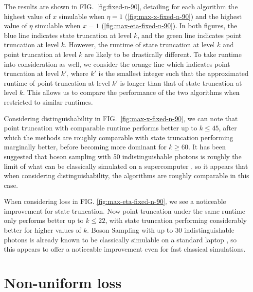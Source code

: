 The results are shown in FIG.\ \ref{fig:fixed-n-90}, detailing for each algorithm the highest value of $x$ simulable when $\eta=1$ (\ref{fig:max-x-fixed-n-90}) and the highest value of $\eta$ simulable when $x=1$ (\ref{fig:max-eta-fixed-n-90}). 
In both figures, the blue line indicates state truncation at level $k$, and the green line indicates point truncation at level $k$. 
However, the runtime of state truncation at level $k$ and point truncation at level $k$ are likely to be drastically different. 
To take runtime into consideration as well, we consider the orange line which indicates point truncation at level $k'$, where $k'$ is the smallest integer such that the approximated runtime of point truncation at level $k'$ is longer than that of state truncation at level $k$. 
This allows us to compare the performance of the two algorithms when restricted to similar runtimes.

Considering distinguishability in FIG.\ \ref{fig:max-x-fixed-n-90}, we can note that point truncation with comparable runtime performs better up to $k\leq 45$, after which the methods are roughly comparable with state truncation performing marginally better, before becoming more dominant for $k\geq 60$. 
It has been suggested that boson sampling with 50 indistinguishable photons is roughly the limit of what can be classically simulated on a supercomputer \cite{neville2017, clifford2017, zhang2018}, so it appears that when considering distinguishability, the algorithms are roughly comparable in this case.

When considering loss in FIG. \ref{fig:max-eta-fixed-n-90}, we see a noticeable improvement for state truncation. 
Now point truncation under the same runtime only performs better up to $k\leq 22$, with state truncation performing considerably better for higher values of $k$. 
Boson Sampling with up to 30 indistinguishable photons is already known to be classically simulable on a standard laptop \cite{neville2017}, so this appears to offer a noticeable improvement even for fast classical simulations.



\section{Non-uniform loss}

